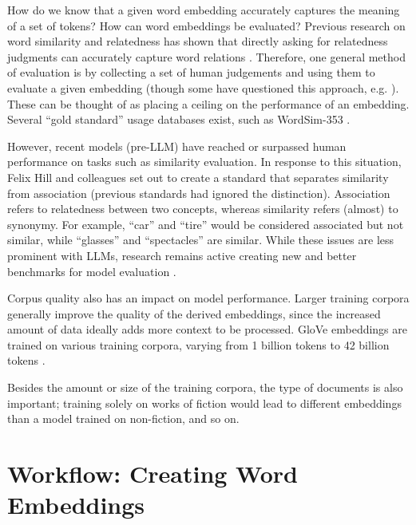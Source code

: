 How do we know that a given word embedding accurately captures the meaning of a set of tokens? How can word embeddings be evaluated? Previous research on word similarity and relatedness has shown that directly asking for relatedness judgments can accurately capture word relations \cite{finkelstein2001placing}. Therefore, one general method of evaluation is by collecting a set of human judgements and using them to evaluate a given embedding (though some have questioned this approach, e.g. \cite{richie2022inter}). These can be thought of as placing a ceiling on the performance of an embedding. Several ``gold standard'' usage databases exist, such as WordSim-353 \cite{finkelstein2001placing, agirre2009study}. 

However, recent models (pre-LLM) have reached or surpassed human performance on tasks such as similarity evaluation. In response to this situation, Felix Hill and colleagues \cite{hill2015simlex} set out to create a standard that separates similarity from association (previous standards had ignored the distinction). Association refers to relatedness between two concepts, whereas similarity refers (almost) to synonymy. For example, ``car'' and ``tire'' would be considered associated but not similar, while ``glasses'' and ``spectacles'' are similar. While these issues are less prominent with LLMs, research remains active creating new and better benchmarks for model evaluation \cite{bugliarello2023measuring}.

Corpus quality also has an impact on model performance. Larger training corpora generally improve the quality of the derived embeddings, since the increased amount of data ideally adds more context to be processed. GloVe embeddings are trained on various training corpora, varying from 1 billion tokens to 42 billion tokens \cite{pennington2014glove}.

Besides the amount or size of the training corpora, the type of documents is also important; training solely on works of fiction would lead to different embeddings than a model trained on non-fiction, and so on.


\section{Workflow: Creating Word Embeddings}\label{createWordEmbeddings}

